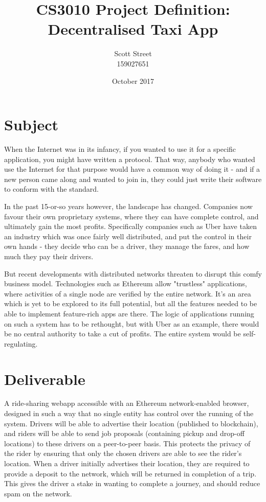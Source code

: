\documentclass{article}
\title{CS3010 Project Definition:\\Decentralised Taxi App}
\author{Scott Street\\{\small 159027651}}
\date{October 2017}
\begin{document}
\maketitle

\section{Subject}

When the Internet was in its infancy, if you wanted to use it for a specific application, you might have written a protocol. That way, anybody who wanted use the Internet for that purpose would have a common way of doing it - and if a new person came along and wanted to join in, they could just write their software to conform with the standard.

In the past 15-or-so years however, the landscape has changed. Companies now favour their own proprietary systems, where they can have complete control, and ultimately gain the most profits. Specifically companies such as Uber have taken an industry which was once fairly well distributed, and put the control in their own hands - they decide who can be a driver, they manage the fares, and how much they pay their drivers.

But recent developments with distributed networks threaten to disrupt this comfy business model. Technologies such as Ethereum allow "trustless" applications, where activities of a single node are verified by the entire network. It's an area which is yet to be explored to its full potential, but all the features needed to be able to implement feature-rich apps are there. The logic of applications running on such a system has to be rethought, but with Uber as an example, there would be no central authority to take a cut of profits. The entire system would be self-regulating.

\section{Deliverable}

A ride-sharing webapp accessible with an Ethereum network-enabled browser, designed in such a way that no single entity has control over the running of the system. Drivers will be able to advertise their location (published to blockchain), and riders will be able to send job proposals (containing pickup and drop-off locations) to these drivers on a peer-to-peer basis. This protects the privacy of the rider by ensuring that only the chosen drivers are able to see the rider’s location. When a driver initially advertises their location, they are required to provide a deposit to the network, which will be returned in completion of a trip. This gives the driver a stake in wanting to complete a journey, and should reduce spam on the network.
\end{document}

